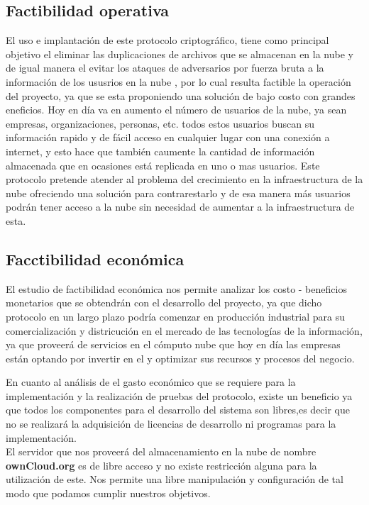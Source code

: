 \subsection{Factibilidad operativa}
El uso e implantación de este protocolo criptográfico, tiene como principal objetivo el eliminar las duplicaciones de archivos que se almacenan en la nube y de igual manera el evitar los ataques de adversarios por fuerza bruta a la información de los ususrios en la nube , por lo cual resulta factible la operación del proyecto, ya que se esta proponiendo una solución de bajo costo con grandes eneficios.
Hoy en día va en aumento el número de usuarios de la nube, ya sean empresas, organizaciones, personas, etc. todos estos usuarios buscan su información rapido y de fácil acceso en cualquier lugar con una conexión a internet, y esto hace que también caumente la cantidad de información almacenada que en ocasiones está replicada en uno o mas usuarios.
Este protocolo pretende atender al problema del crecimiento en la infraestructura de la nube ofreciendo una solución para contrarestarlo y de esa manera más usuarios podrán tener acceso a la nube sin necesidad de aumentar a la infraestructura de esta.

\subsection{Facctibilidad económica}
El estudio de factibilidad económica nos permite analizar los costo - beneficios monetarios que se obtendrán con el desarrollo del proyecto, ya que dicho protocolo en un largo plazo podría comenzar en producción industrial para su comercialización y districución en el mercado de las tecnologías de la información, ya que proveerá de servicios en el cómputo nube que hoy en día las empresas están optando por invertir en el y optimizar sus recursos y procesos del negocio. 

En cuanto al análisis de el gasto económico que se requiere para la implementación y la realización de pruebas del protocolo, existe un beneficio ya que todos los componentes para el desarrollo del sistema son libres,es decir que no se realizará la adquisición de licencias de desarrollo ni programas para la implementación. 
\\ El servidor que nos proveerá del almacenamiento en la nube de nombre \textbf{ownCloud.org} es de libre acceso y no existe restricción alguna para la utilización de este. Nos permite una libre manipulación y configuración de tal modo que podamos cumplir nuestros objetivos.


